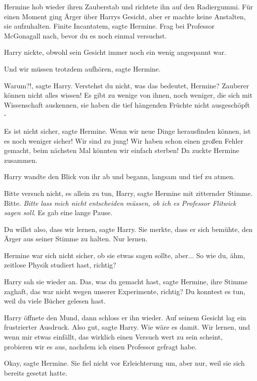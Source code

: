 Hermine hob wieder ihren Zauberstab und richtete ihn auf den Radiergummi. Für
einen Moment ging Ärger über Harrys Gesicht, aber er machte keine Anstalten, sie
aufzuhalten. \glqq{}Finite Incantatem\grqq{}, sagte Hermine. \glqq{}Frag bei
Professor McGonagall nach, bevor du es noch einmal versuchst.\grqq{}

Harry nickte, obwohl sein Gesicht immer noch ein wenig angespannt war.

\glqq{}Und wir müssen trotzdem aufhören\grqq{}, sagte Hermine.

\glqq{}Warum?!\grqq{}, sagte Harry. \glqq{}Verstehst du nicht, was das bedeutet,
Hermine? Zauberer können nicht alles wissen! Es gibt zu wenige von ihnen, noch
weniger, die sich mit Wissenschaft auskennen, sie haben die tief hängenden
Früchte nicht ausgeschöpft -\grqq{}

\glqq{}Es ist nicht sicher\grqq{}, sagte Hermine. \glqq{}Wenn wir neue Dinge
herausfinden können, ist es noch weniger sicher! Wir sind zu jung! Wir haben
schon einen großen Fehler gemacht, beim nächsten Mal könnten wir einfach
sterben!\grqq{} Da zuckte Hermine zusammen.

Harry wandte den Blick von ihr ab und begann, langsam und tief zu atmen.

\glqq{}Bitte versuch nicht, es allein zu tun, Harry\grqq{}, sagte Hermine mit
zitternder Stimme. \glqq{}Bitte.\grqq{} \emph{Bitte lass mich nicht entscheiden
müssen, ob ich es Professor Flitwick sagen soll}. Es gab eine lange Pause.

\glqq{}Du willst also, dass wir lernen\grqq{}, sagte Harry. Sie merkte, dass er
sich bemühte, den Ärger aus seiner Stimme zu halten. \glqq{}Nur lernen.\grqq{}

Hermine war sich nicht sicher, ob sie etwas sagen sollte, aber... \glqq{}So wie
du, ähm, zeitlose Physik studiert hast, richtig?\grqq{}

Harry sah sie wieder an. \glqq{}Das, was du gemacht hast\grqq{}, sagte Hermine,
ihre Stimme zaghaft, \glqq{}das war nicht wegen unserer Experimente, richtig? Du
konntest es tun, weil du viele Bücher gelesen hast.\grqq{}

Harry öffnete den Mund, dann schloss er ihn wieder. Auf seinem Gesicht lag ein
frustrierter Ausdruck. \glqq{}Also gut\grqq{}, sagte Harry. \glqq{}Wie wäre es
damit. Wir lernen, und wenn mir etwas einfällt, das wirklich einen Versuch wert
zu sein scheint, probieren wir es aus, nachdem ich einen Professor gefragt
habe.\grqq{}

\glqq{}Okay\grqq{}, sagte Hermine. Sie fiel nicht vor Erleichterung um, aber nur,
weil sie sich bereits gesetzt hatte.

